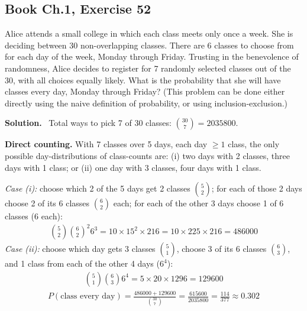 \documentclass[11pt]{article}
\newcommand{\Sol}{\vspace{2pt}\noindent\textbf{Solution.}\ }
\begin{document}
\subsection{Book Ch.1, Exercise 52}
\begin{qbox}
Alice attends a small college in which each class meets only once a week. She is deciding between 30 non-overlapping classes. There are 6 classes to choose from for each day of the week, Monday through Friday. Trusting in the benevolence of randomness, Alice decides to register for 7 randomly selected classes out of the 30, with all choices equally likely. What is the probability that she will have classes every day, Monday through Friday? (This problem can be done either directly using the naive definition of probability, or using inclusion-exclusion.)
\end{qbox}
\Sol
Total ways to pick 7 of 30 classes: $\binom{30}{7}=2035800$.

\textbf{Direct counting.} With 7 classes over 5 days, each day $\ge1$ class, the only possible day-distributions of class-counts are: (i) two days with 2 classes, three days with 1 class; or (ii) one day with 3 classes, four days with 1 class.

\emph{Case (i):} choose which 2 of the 5 days get 2 classes $\binom{5}{2}$; for each of those 2 days choose 2 of its 6 classes $\binom{6}{2}$ each; for each of the other 3 days choose 1 of 6 classes ($6$ each):
\begin{align*}
\binom{5}{2}\binom{6}{2}^2 6^3 = 10\times 15^2\times 216 = 10\times225\times216 = 486000
\end{align*}
\emph{Case (ii):} choose which day gets 3 classes $\binom{5}{1}$, choose 3 of its 6 classes $\binom{6}{3}$, and 1 class from each of the other 4 days ($6^4$):
\begin{align*}
\binom{5}{1}\binom{6}{3}6^4 = 5\times 20\times 1296 = 129600
\end{align*}
\begin{align*}
P(\text{class every day}) = \frac{486000+129600}{\binom{30}{7}} = \frac{615600}{2035800} = \frac{114}{377} \approx 0.302
\end{align*}
\end{document}
